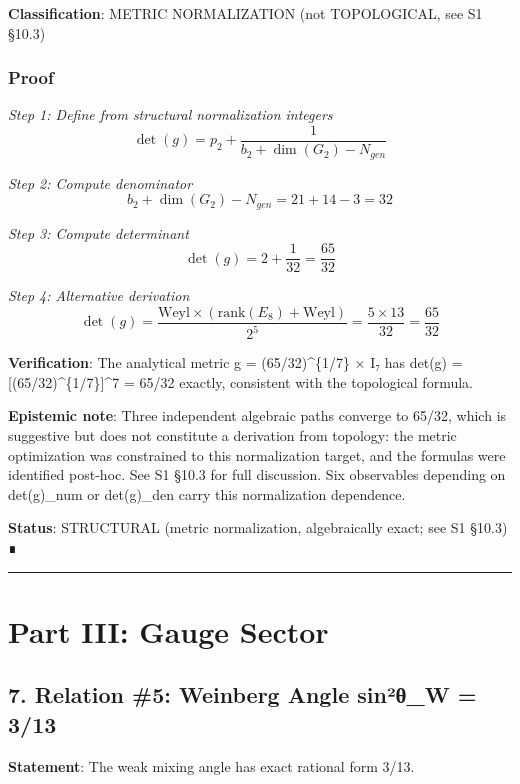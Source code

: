 \documentclass[11pt,a4paper]{article}
\begin{document}
\textbf{Classification}: METRIC NORMALIZATION (not TOPOLOGICAL, see S1 §10.3)

\subsubsection{Proof}\label{proof-2}

\emph{Step 1: Define from structural normalization integers}
\[\det(g) = p_2 + \frac{1}{b_2 + \dim(G_2) - N_{gen}}\]

\emph{Step 2: Compute denominator}
\[b_2 + \dim(G_2) - N_{gen} = 21 + 14 - 3 = 32\]

\emph{Step 3: Compute determinant}
\[\det(g) = 2 + \frac{1}{32} = \frac{65}{32}\]

\emph{Step 4: Alternative derivation}
\[\det(g) = \frac{\text{Weyl} \times (\text{rank}(E_8) + \text{Weyl})}{2^5} = \frac{5 \times 13}{32} = \frac{65}{32}\]

\textbf{Verification}: The analytical metric g = (65/32)\^{}\{1/7\} × I₇ has det(g) = {[}(65/32)\^{}\{1/7\}{]}\^{}7 = 65/32 exactly, consistent with the topological formula.

\textbf{Epistemic note}: Three independent algebraic paths converge to 65/32, which is suggestive but does not constitute a derivation from topology: the metric optimization was constrained to this normalization target, and the formulas were identified post-hoc. See S1 §10.3 for full discussion. Six observables depending on det(g)\_num or det(g)\_den carry this normalization dependence.

\textbf{Status}: STRUCTURAL (metric normalization, algebraically exact; see S1 §10.3) ∎

\begin{center}\rule{0.5\linewidth}{0.5pt}\end{center}

\section{Part III: Gauge Sector}\label{part-iii-gauge-sector}

\subsection{7. Relation \#5: Weinberg Angle sin²θ\_W = 3/13}\label{relation-5-weinberg-angle-sinuxb2ux3b8_w-313}

\textbf{Statement}: The weak mixing angle has exact rational form 3/13.
\end{document}
